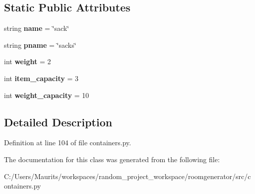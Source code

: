 \subsection*{Static Public Attributes}
\begin{DoxyCompactItemize}
\item 
\hypertarget{classcontainers_1_1_sack_a759d606210f0156bd0fa304d8fcde2da}{}string {\bfseries name} = \char`\"{}sack\char`\"{}\label{classcontainers_1_1_sack_a759d606210f0156bd0fa304d8fcde2da}

\item 
\hypertarget{classcontainers_1_1_sack_a1c3a8892044ba0664bbe662d00f16eca}{}string {\bfseries pname} = \char`\"{}sacks\char`\"{}\label{classcontainers_1_1_sack_a1c3a8892044ba0664bbe662d00f16eca}

\item 
\hypertarget{classcontainers_1_1_sack_a5bbf01fee3eeae9c79fb9556da4d6cb3}{}int {\bfseries weight} = 2\label{classcontainers_1_1_sack_a5bbf01fee3eeae9c79fb9556da4d6cb3}

\item 
\hypertarget{classcontainers_1_1_sack_a9f28ff410bea24436657f17580d75dd8}{}int {\bfseries item\+\_\+capacity} = 3\label{classcontainers_1_1_sack_a9f28ff410bea24436657f17580d75dd8}

\item 
\hypertarget{classcontainers_1_1_sack_a9d39f346ec0145a087ba450e8dccdb1c}{}int {\bfseries weight\+\_\+capacity} = 10\label{classcontainers_1_1_sack_a9d39f346ec0145a087ba450e8dccdb1c}

\end{DoxyCompactItemize}


\subsection{Detailed Description}


Definition at line 104 of file containers.\+py.



The documentation for this class was generated from the following file\+:\begin{DoxyCompactItemize}
\item 
C\+:/\+Users/\+Maurits/workspaces/random\+\_\+project\+\_\+workspace/roomgenerator/src/containers.\+py\end{DoxyCompactItemize}
